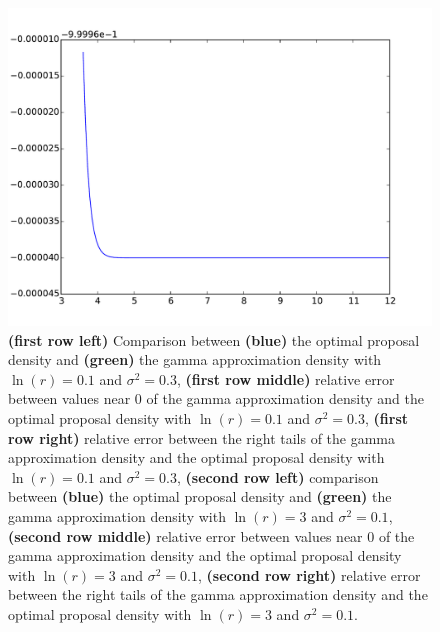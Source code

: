 \documentclass{article}
\begin{document}
\begin{figure}[htb]
\begin{minipage}{.3\textwidth}
	\end{minipage}
	\begin{minipage}{.3\textwidth}
		\centering
		\includegraphics[width=0.97\linewidth]{bootstrap-filter/relative_tail_simple_3_1.pdf}
	\end{minipage}
	\caption{\textbf{(first row left)} Comparison between \textbf{(blue)} the optimal proposal density and \textbf{(green)} the gamma approximation density with $\ln(r)=0.1$ and $\sigma^2 = 0.3$, \textbf{(first row middle)} relative error between values near 0 of the gamma approximation density and the optimal proposal density with $\ln(r)=0.1$ and $\sigma^2 = 0.3$, \textbf{(first row right)} relative error between the right tails of the gamma approximation density and the optimal proposal density with $\ln(r)=0.1$ and $\sigma^2 = 0.3$, \textbf{(second row left)} comparison between \textbf{(blue)} the optimal proposal density and \textbf{(green)} the gamma approximation density with $\ln(r)=3$ and $\sigma^2 = 0.1$, \textbf{(second row middle)} relative error between values near 0 of the gamma approximation density and the optimal proposal density with $\ln(r)=3$ and $\sigma^2 = 0.1$, \textbf{(second row right)} relative error between the right tails of the gamma approximation density and the optimal proposal density with $\ln(r)=3$ and $\sigma^2 = 0.1$.}
	\label{fig:movingsimple}
\end{figure}
\end{document}
